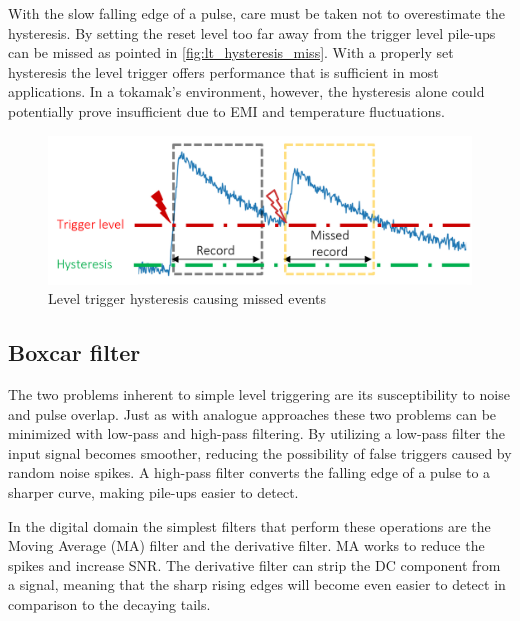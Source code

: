 With the slow falling edge of a pulse, care must be taken not to 
overestimate the hysteresis. By setting the reset level too far away
from the trigger level pile-ups can be missed as pointed in
\autoref{fig:lt_hysteresis_miss}. With a properly set hysteresis
the level trigger offers performance that is sufficient in most applications.
In a tokamak's environment, however, the hysteresis
alone could potentially prove insufficient due to 
EMI and temperature fluctuations.
\begin{figure}[H]
  \centering
  \includegraphics[width=.7\linewidth]{media/lt_hysteresis_miss.png}
  \caption{Level trigger hysteresis causing missed events}
  \label{fig:lt_hysteresis_miss} 
\end{figure}
\subsection{Boxcar filter} \label{ssec:boxcar_filter}


The two problems inherent to simple level triggering 
are its susceptibility to noise and pulse overlap.
Just as with analogue approaches these two problems 
can be minimized with low-pass and high-pass filtering.
By utilizing a low-pass filter the input signal becomes 
smoother, reducing the possibility of 
false triggers caused by random noise spikes. 
A high-pass filter converts the falling edge of a pulse to a sharper curve,
making pile-ups easier to detect.


In the digital domain the simplest filters that perform
these operations are the Moving Average (MA) filter and 
the derivative filter. MA works to reduce the spikes and increase 
SNR. The derivative filter can strip the DC component from
a signal, meaning that the sharp rising edges will become
even easier to detect in comparison to the decaying tails.


